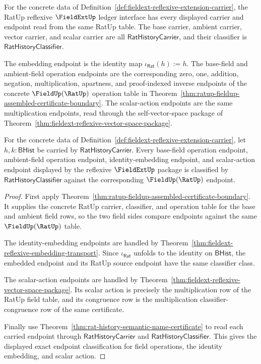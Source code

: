 \begin{definition}
\label{def:fieldext-ratup-reflexive-ledger-interface}
For the concrete data of
Definition~\ref{def:fieldext-reflexive-extension-carrier}, the RatUp
reflexive $\FieldExtUp$ ledger interface has every displayed carrier and
endpoint read from the same RatUp table. The base carrier, ambient carrier,
vector carrier, and scalar carrier are all $\mathsf{RatHistoryCarrier}$, and
their classifier is $\mathsf{RatHistoryClassifier}$.

The embedding endpoint is the identity map
$\iota_{\mathsf{Rat}}(h):=h$. The base-field and ambient-field operation
endpoints are the corresponding zero, one, addition, negation,
multiplication, apartness, and proof-indexed inverse endpoints of the
concrete $\FieldUp(\RatUp)$ operation table in
Theorem~\ref{thm:ratup-fieldup-assembled-certificate-boundary}. The
scalar-action endpoints are the same multiplication endpoints, read through
the self-vector-space package of
Theorem~\ref{thm:fieldext-reflexive-vector-space-package}.
\end{definition}

\begin{theorem}
\label{thm:fieldext-ratup-reflexive-exact-endpoint-classification}
For the concrete data of
Definition~\ref{def:fieldext-reflexive-extension-carrier}, let
$h,k:\mathsf{BHist}$ be carried by $\mathsf{RatHistoryCarrier}$. Every
base-field operation endpoint, ambient-field operation endpoint,
identity-embedding endpoint, and scalar-action endpoint displayed by the
reflexive $\FieldExtUp$ package is classified by
$\mathsf{RatHistoryClassifier}$ against the corresponding
$\FieldUp(\RatUp)$ endpoint.
\end{theorem}
\begin{proof}
First apply
Theorem~\ref{thm:ratup-fieldup-assembled-certificate-boundary}. It supplies
the concrete RatUp carrier, classifier, and operation table for the base and
ambient field rows, so the two field sides compare endpoints against the same
$\FieldUp(\RatUp)$ table.

The identity-embedding endpoints are handled by
Theorem~\ref{thm:fieldext-reflexive-embedding-transport}. Since
$\iota_{\mathsf{Rat}}$ unfolds to the identity on $\mathsf{BHist}$, the
embedded endpoint and its RatUp source endpoint have the same classifier
class.

The scalar-action endpoints are handled by
Theorem~\ref{thm:fieldext-reflexive-vector-space-package}. Its scalar action
is precisely the multiplication row of the RatUp field table, and its
congruence row is the multiplication classifier-congruence row of the same
certificate.

Finally use
Theorem~\ref{thm:rat-history-semantic-name-certificate} to read each carried
endpoint through $\mathsf{RatHistoryCarrier}$ and
$\mathsf{RatHistoryClassifier}$. This gives the displayed exact endpoint
classification for field operations, the identity embedding, and scalar
action.
\end{proof}

